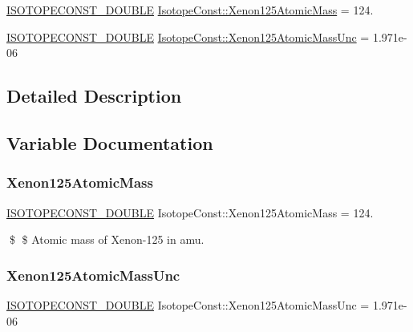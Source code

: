 \begin{DoxyCompactItemize}
\item 
\mbox{\hyperlink{group___isotope_const-_macros_ga8f45a7272ce02c0b4c65c44636ed719a}{I\+S\+O\+T\+O\+P\+E\+C\+O\+N\+S\+T\+\_\+\+D\+O\+U\+B\+LE}} \mbox{\hyperlink{group___isotope_const-_xenon-_xe125_ga7449e0b0c942dad76be03d9693b44312}{Isotope\+Const\+::\+Xenon125\+Atomic\+Mass}} = 124.
\item 
\mbox{\hyperlink{group___isotope_const-_macros_ga8f45a7272ce02c0b4c65c44636ed719a}{I\+S\+O\+T\+O\+P\+E\+C\+O\+N\+S\+T\+\_\+\+D\+O\+U\+B\+LE}} \mbox{\hyperlink{group___isotope_const-_xenon-_xe125_ga61e7ebbfa2018084a7dc91f503f14601}{Isotope\+Const\+::\+Xenon125\+Atomic\+Mass\+Unc}} = 1.\+971e-\/06
\end{DoxyCompactItemize}


\subsection{Detailed Description}


\subsection{Variable Documentation}
\mbox{\label{group___isotope_const-_xenon-_xe125_ga7449e0b0c942dad76be03d9693b44312}} 
\subsubsection{\texorpdfstring{Xenon125\+Atomic\+Mass}{Xenon125AtomicMass}}
{\footnotesize\ttfamily \mbox{\hyperlink{group___isotope_const-_macros_ga8f45a7272ce02c0b4c65c44636ed719a}{I\+S\+O\+T\+O\+P\+E\+C\+O\+N\+S\+T\+\_\+\+D\+O\+U\+B\+LE}} Isotope\+Const\+::\+Xenon125\+Atomic\+Mass = 124.}

\$ \$ Atomic mass of Xenon-\/125 in amu. \mbox{\label{group___isotope_const-_xenon-_xe125_ga61e7ebbfa2018084a7dc91f503f14601}} 
\subsubsection{\texorpdfstring{Xenon125\+Atomic\+Mass\+Unc}{Xenon125AtomicMassUnc}}
{\footnotesize\ttfamily \mbox{\hyperlink{group___isotope_const-_macros_ga8f45a7272ce02c0b4c65c44636ed719a}{I\+S\+O\+T\+O\+P\+E\+C\+O\+N\+S\+T\+\_\+\+D\+O\+U\+B\+LE}} Isotope\+Const\+::\+Xenon125\+Atomic\+Mass\+Unc = 1.\+971e-\/06}

